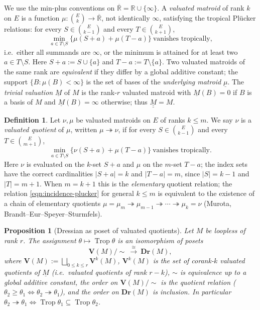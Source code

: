 \documentclass{article}
\newtheorem{proposition}[theorem]{Proposition}
\theoremstyle{definition}
\newtheorem{definition}[theorem]{Definition}
\newcommand{\Rbar}{\overline{\mathbb{R}}}
\newcommand{\R}{\mathbb{R}}
\newcommand{\Trop}{\operatorname{Trop}}
\newcommand{\onto}{\twoheadrightarrow}
\newcommand{\Dr}{\mathbf{Dr}}
\newcommand{\bV}{\mathbf V}
\begin{document}
We use the min-plus conventions on $\Rbar=\R\cup\{\infty\}$. A \emph{valuated matroid} of rank $k$
on $E$ is a function $\mu\colon\binom{E}{k}\to\Rbar$, not identically $\infty$, satisfying the
tropical Pl\"ucker relations: for every $S\in\binom{E}{k-1}$ and every $T\in\binom{E}{k+1}$,
\begin{equation}\label{eqn:plucker}
  \min_{a\in T\setminus S}\bigl\{\mu(S+a)+\mu(T-a)\bigr\}\ \text{vanishes tropically,}
\end{equation}
i.e.\ either all summands are $\infty$, or the minimum is attained for at least two
$a\in T\setminus S$. Here $S+a:=S\cup\{a\}$ and $T-a:=T\setminus\{a\}$. Two valuated matroids of the
same rank are \emph{equivalent} if they differ by a global additive constant; the support
$\{B:\mu(B)<\infty\}$ is the set of bases of the \emph{underlying matroid} $\underline\mu$. The
\emph{trivial valuation} $\underline M$ of $M$ is the rank-$r$ valuated matroid with $\underline
M(B)=0$ if $B$ is a basis of $M$ and $\underline M(B)=\infty$ otherwise; thus
$\underline{\underline M}=M$.

\begin{definition}\label{def:quotient}
Let $\nu,\mu$ be valuated matroids on $E$ of ranks $k\le m$. We say $\nu$ is a \emph{valuated
quotient} of $\mu$, written $\mu\onto\nu$, if for every $S\in\binom{E}{k-1}$ and every
$T\in\binom{E}{m+1}$,
\begin{equation}\label{eqn:incidence-plucker}
  \min_{a\in T\setminus S}\bigl\{\nu(S+a)+\mu(T-a)\bigr\}\ \text{vanishes tropically.}
\end{equation}
Here $\nu$ is evaluated on the $k$-set $S+a$ and $\mu$ on the $m$-set $T-a$; the index sets have the
correct cardinalities $|S+a|=k$ and $|T-a|=m$, since $|S|=k-1$ and $|T|=m+1$. When $m=k+1$ this is
the \emph{elementary} quotient relation; the relation \eqref{eqn:incidence-plucker} for general
$k\le m$ is equivalent to the existence of a chain of elementary quotients
$\mu=\mu_m\onto\mu_{m-1}\onto\cdots\onto\mu_k=\nu$ (Murota, Brandt--Eur--Speyer--Sturmfels).
\end{definition}

\begin{proposition}[Dressian as poset of valuated quotients]\label{fact:dressian}
Let $M$ be loopless of rank $r$. The assignment $\theta\mapsto\Trop\theta$ is an isomorphism of
posets
\[
  \bV(M)/\!\sim\ \xrightarrow{\ \cong\ }\ \Dr(M),
\]
where $\bV(M):=\bigsqcup_{0\le k\le r}\bV^{k}(M)$, $\bV^{k}(M)$ is the set of corank-$k$ valuated
quotients of $\underline M$ (i.e.\ valuated quotients of rank $r-k$), $\sim$ is equivalence up to a
global additive constant, the order on $\bV(M)/\!\sim$ is the quotient relation
($\theta_2\ge\theta_1\iff\theta_2\onto\theta_1$), and the order on $\Dr(M)$ is inclusion. In
particular $\theta_2\onto\theta_1\iff\Trop\theta_1\subseteq\Trop\theta_2$.
\end{proposition}
\end{document}
